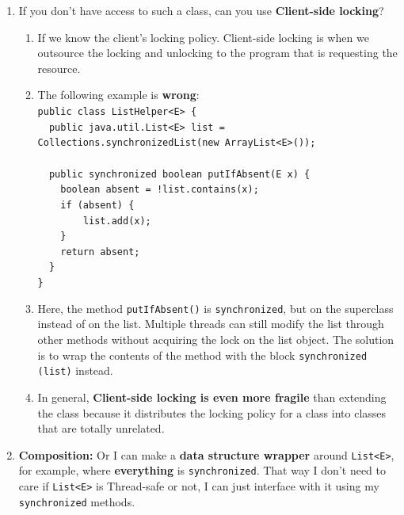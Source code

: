 \documentclass{article}
\begin{document}
\begin{enumerate}
    \item If you don't have access to such a class, can you use \textbf{Client-side locking}?
        \begin{enumerate}
            \item If we know the client's locking policy. Client-side locking is when we outsource the locking and unlocking to the program that is requesting the resource.
            \item The following example is \textbf{wrong}:\\
                \lstinline|public class ListHelper<E> {|\\
                \lstinline|  public java.util.List<E> list = Collections.synchronizedList(new ArrayList<E>());|\\\\
                \lstinline|  public synchronized boolean putIfAbsent(E x) {|\\
                \lstinline|    boolean absent = !list.contains(x);|\\
                \lstinline|    if (absent) {|\\
                \lstinline|        list.add(x);|\\
                \lstinline|    }|\\
                \lstinline|    return absent;|\\
                \lstinline|  }|\\
                \lstinline|}|
            \item Here, the method \lstinline{putIfAbsent()} is \lstinline{synchronized}, but on the superclass instead of on the list. Multiple threads can still modify the list through other methods without acquiring the lock on the list object. The solution is to wrap the contents of the method with the block \lstinline{synchronized (list)} instead.
            \item In general, \textbf{Client-side locking is even more fragile} than extending the class because it distributes the locking policy for a class into classes that are totally unrelated.
        \end{enumerate}
    \item \textbf{Composition:} Or I can make a \textbf{data structure wrapper} around \lstinline{List<E>}, for example, where \textbf{everything} is \lstinline{synchronized}. That way I don't need to care if \lstinline{List<E>} is Thread-safe or not, I can just interface with it using my \lstinline{synchronized} methods.
        \begin{enumerate}

\end{enumerate}
\end{enumerate}
\end{document}
